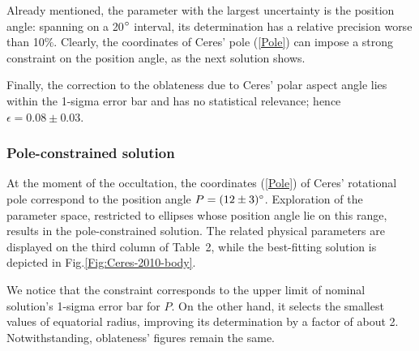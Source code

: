 \documentclass[useAMS,usenatbib]{mn2e}
\begin{document}
Already mentioned, the parameter with the largest uncertainty is the position angle: spanning on a 20$\hbox{$^\circ$}$ interval, its determination has a relative precision worse than 10$\%$. Clearly, the coordinates of Ceres' pole (\ref{Pole}) can impose a strong constraint on the position angle, as the next solution shows.

Finally, the correction to the oblateness due to Ceres' polar aspect angle lies within the 1-sigma error bar and has no statistical relevance; hence $\epsilon = 0.08 \pm 0.03$.





\subsubsection{Pole-constrained solution}

At the moment of the occultation, the coordinates (\ref{Pole}) of Ceres' rotational pole correspond to the position angle $P = (12 \pm 3)\hbox{$^\circ$}$. Exploration of the parameter space, restricted to ellipses whose position angle lie on this range, results in the pole-constrained solution. The related physical parameters are displayed on the third column of Table~2, while the best-fitting solution is depicted in Fig.\ref{Fig:Ceres-2010-body}.

We notice that the constraint corresponds to the upper limit of nominal solution's 1-sigma error bar for $P$. On the other hand, it selects the smallest values of equatorial radius, improving its determination by a factor of about 2. Notwithstanding, oblateness' figures remain the same.
\end{document}
